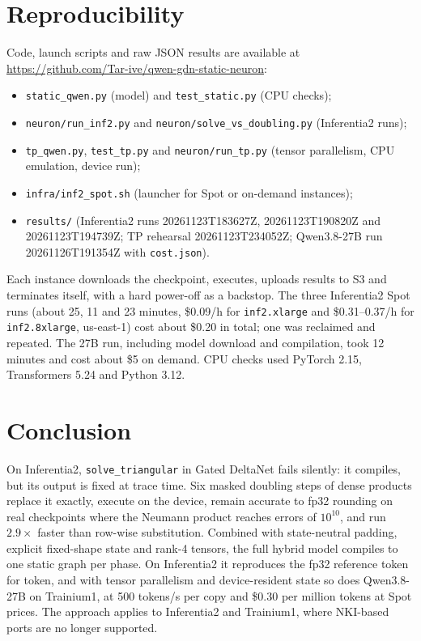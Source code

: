 \documentclass[11pt]{article}
\theoremstyle{remark}
\begin{document}
\section{Reproducibility}\label{sec:repro}
Code, launch scripts and raw JSON results are available at
\url{https://github.com/Tar-ive/qwen-gdn-static-neuron}:
\begin{itemize}
\item \texttt{static\_qwen.py} (model) and \texttt{test\_static.py} (CPU checks);
\item \texttt{neuron/run\_inf2.py} and \texttt{neuron/solve\_vs\_doubling.py} (Inferentia2 runs);
\item \texttt{tp\_qwen.py}, \texttt{test\_tp.py} and \texttt{neuron/run\_tp.py} (tensor parallelism, CPU emulation, device
run);
\item \texttt{infra/inf2\_spot.sh} (launcher for Spot or on-demand instances);
\item \texttt{results/} (Inferentia2 runs 20261123T183627Z, 20261123T190820Z and 20261123T194739Z; TP rehearsal
20261123T234052Z; Qwen3.8-27B run 20261126T191354Z with \texttt{cost.json}).
\end{itemize}
Each instance downloads the checkpoint, executes, uploads results to S3 and terminates itself, with a hard power-off as a
backstop. The three Inferentia2 Spot runs (about 25, 11 and 23 minutes, \$0.09/h for \texttt{inf2.xlarge} and \$0.31--0.37/h
for \texttt{inf2.8xlarge}, us-east-1) cost about \$0.20 in total; one was reclaimed and repeated. The 27B run, including model
download and compilation, took 12 minutes and cost about \$5 on demand. CPU checks used PyTorch 2.15, Transformers 5.24 and
Python 3.12.

\section{Conclusion}
On Inferentia2, \texttt{solve\_triangular} in Gated DeltaNet fails silently: it compiles, but its output is fixed at trace
time. Six masked doubling steps of dense products replace it exactly, execute on the device, remain accurate to fp32 rounding
on real checkpoints where the Neumann product reaches errors of $10^{10}$, and run $2.9\times$ faster than row-wise
substitution. Combined with state-neutral padding, explicit fixed-shape state and rank-4 tensors, the full hybrid model
compiles to one static graph per phase. On Inferentia2 it reproduces the fp32 reference token for token, and with tensor
parallelism and device-resident state so does Qwen3.8-27B on Trainium1, at 500 tokens/s per copy and \$0.30 per million
tokens at Spot prices. The approach applies to Inferentia2 and Trainium1, where NKI-based ports are no longer supported.
\end{document}

